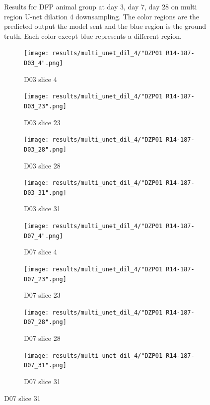 \begin{figure}[!htb]
  \caption{Results for DFP animal group at day 3, day 7, day 28 on multi region U-net dilation 4 downsampling. The color regions are the predicted output the model sent and the blue region is the ground truth. Each color except blue represents a different region.}
  \label{fig:results_multi_unetdil4_DFP}
\end{figure}




\begin{figure}[!htb]  
    \centering %
\begin{subfigure}{0.25\textwidth}
  \texttt{[image: results/multi\_unet\_dil\_4/"DZP01 R14-187-D03\_4".png]}
  \caption{D03 slice 4}
\end{subfigure}\hfil %
\begin{subfigure}{0.25\textwidth}
  \texttt{[image: results/multi\_unet\_dil\_4/"DZP01 R14-187-D03\_23".png]}
  \caption{D03 slice 23}
\end{subfigure}\hfil %
\begin{subfigure}{0.25\textwidth}
  \texttt{[image: results/multi\_unet\_dil\_4/"DZP01 R14-187-D03\_28".png]}
  \caption{D03 slice 28}
\end{subfigure}\hfil %
\begin{subfigure}{0.25\textwidth}
  \texttt{[image: results/multi\_unet\_dil\_4/"DZP01 R14-187-D03\_31".png]}
  \caption{D03 slice 31}
\end{subfigure}

\medskip
\begin{subfigure}{0.25\textwidth}
  \texttt{[image: results/multi\_unet\_dil\_4/"DZP01 R14-187-D07\_4".png]}
  \caption{D07 slice 4}
\end{subfigure}\hfil %
\begin{subfigure}{0.25\textwidth}
  \texttt{[image: results/multi\_unet\_dil\_4/"DZP01 R14-187-D07\_23".png]}
  \caption{D07 slice 23}
\end{subfigure}\hfil %
\begin{subfigure}{0.25\textwidth}
  \texttt{[image: results/multi\_unet\_dil\_4/"DZP01 R14-187-D07\_28".png]}
  \caption{D07 slice 28}
\end{subfigure}\hfil %
\begin{subfigure}{0.25\textwidth}
  \texttt{[image: results/multi\_unet\_dil\_4/"DZP01 R14-187-D07\_31".png]}
  \caption{D07 slice 31}
\end{subfigure}


\end{figure}
